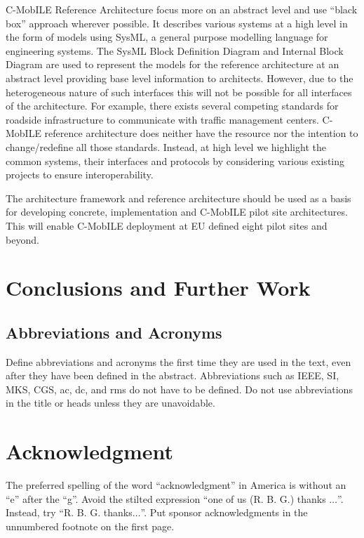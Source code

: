 \documentclass[conference]{IEEEtran}
\begin{document}
C-MobILE Reference Architecture focus more on an abstract level and use “black box” approach wherever possible. It describes various systems at a high level in the form of models using SysML, a general purpose modelling language for engineering systems. The SysML Block Definition Diagram and Internal Block Diagram are used to represent the models for the reference architecture at an abstract level providing base level information to architects. However, due to the heterogeneous nature of such interfaces this will not be possible for all interfaces of the architecture. For example, there exists several competing standards for roadside infrastructure to communicate with traffic management centers. C-MobILE reference architecture does neither have the resource nor the intention to change/redefine all those standards. Instead, at high level we highlight the common systems, their interfaces and protocols by considering various existing projects to ensure interoperability.

The architecture framework and reference architecture should be used as a basis for developing concrete, implementation and C-MobILE pilot site architectures. This will enable C-MobILE deployment at EU defined eight pilot sites and beyond. 


\section{Conclusions and Further Work}



\subsection{Abbreviations and Acronyms}\label{AA}
Define abbreviations and acronyms the first time they are used in the text, 
even after they have been defined in the abstract. Abbreviations such as 
IEEE, SI, MKS, CGS, ac, dc, and rms do not have to be defined. Do not use 
abbreviations in the title or heads unless they are unavoidable.









\section*{Acknowledgment}

The preferred spelling of the word ``acknowledgment'' in America is without 
an ``e'' after the ``g''. Avoid the stilted expression ``one of us (R. B. 
G.) thanks $\ldots$''. Instead, try ``R. B. G. thanks$\ldots$''. Put sponsor 
acknowledgments in the unnumbered footnote on the first page.
\end{document}
